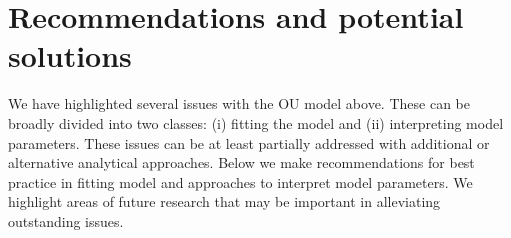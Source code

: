 \documentclass[a4paper,12pt]{article}
\begin{document}

\section{Recommendations and potential solutions}

  We have highlighted several issues with the OU model above. These can be broadly divided into two classes: (i) fitting the model and (ii) interpreting model parameters. These issues can be at least partially addressed with additional or alternative analytical approaches. Below we make recommendations for best practice in fitting model and approaches to interpret model parameters. We highlight areas of future research that may be important in alleviating outstanding issues.
  
\end{document}
